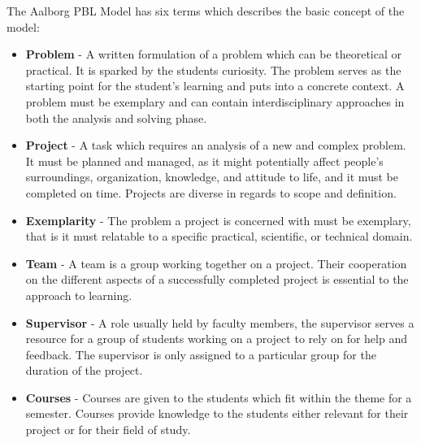 The Aalborg PBL Model has six terms which describes the basic concept of the model:

\begin{itemize}
	\item \textbf{Problem} - A written formulation of a problem which can be theoretical or practical. It is sparked by the students curiosity. The problem serves as the starting point for the student's learning and puts into a concrete context. A problem must be exemplary and can contain interdisciplinary approaches	in both the analysis and solving phase.
	\item \textbf{Project} - A task which requires an analysis of a new and complex problem. It must be planned and managed, as it might potentially affect people's surroundings, organization, knowledge, and attitude to life, and it must be completed on time. Projects are diverse in regards to scope and definition.
	\item \textbf{Exemplarity} - The problem a project is concerned with must be exemplary, that is it must relatable to a specific practical, scientific, or technical domain.
	\item \textbf{Team} - A team is a group working together on a project. Their cooperation on the different aspects of a successfully completed project is essential to the approach to learning.
	\item \textbf{Supervisor} - A role usually held by faculty members, the supervisor serves a resource for a group of students working on a project to rely on for help and feedback. The supervisor is only assigned to a particular group for the duration of the project. 
	\item \textbf{Courses} - Courses are given to the students which fit within the theme for a semester. Courses provide knowledge to the students either relevant for their project or for their field of study.
\end{itemize}

